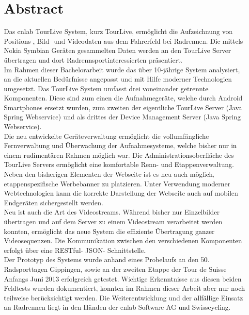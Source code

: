 \chapter*{Abstract}
Das cnlab TourLive System, kurz TourLive, ermöglicht die Aufzeichnung von Positions-, Bild- und Videodaten aus dem Fahrerfeld bei Radrennen. Die mittels Nokia Symbian Geräten gesammelten Daten werden an den TourLive Server übertragen und dort Radrennsportinteressierten präsentiert.
\\

Im Rahmen dieser Bachelorarbeit wurde das über 10-jährige System analysiert, an die aktuellen Bedürfnisse angepasst und mit Hilfe moderner Technologien umgesetzt. Das TourLive System umfasst drei voneinander getrennte Komponenten. Diese sind zum einen die Aufnahmegeräte, welche durch Android Smartphones ersetzt wurden, zum zweiten der eigentliche TourLive Server (Java Spring Webservice) und als drittes der Device Management Server (Java Spring Webservice). 
\\ 

Die neu entwickelte Geräteverwaltung ermöglicht die vollumfängliche Fernverwaltung und Überwachung der Aufnahmesysteme, welche bisher nur in einem rudimentären Rahmen möglich war. Die Administrationsoberfläche des TourLive Servers ermöglicht eine komfortable Renn- und Etappenverwaltung. Neben den bisherigen Elementen der Webseite ist es neu auch möglich, etappenspezifische Werbebanner zu platzieren. Unter Verwendung moderner Webtechnologien kann die korrekte  Darstellung der Webseite auch auf mobilen Endgeräten sichergestellt werden.
\\

Neu ist auch die Art des Videostreams. Während bisher nur Einzelbilder übertragen und auf dem Server zu einem Videostream verarbeitet werden konnten, ermöglicht das neue System die effiziente Übertragung ganzer Videosequenzen. Die Kommunikation zwischen den verschiedenen Komponenten erfolgt über eine RESTful- JSON- Schnittstelle. 
\\

Der Prototyp des Systems wurde anhand eines Probelaufs an den 50. Radsporttagen Gippingen, sowie an der zweiten Etappe der Tour de Suisse Anfangs Juni 2013 erfolgreich getestet. Wichtige Erkenntnisse aus diesen beiden Feldtests wurden dokumentiert, konnten im Rahmen dieser Arbeit aber nur noch teilweise berücksichtigt werden. Die Weiterentwicklung und der allfällige Einsatz an Radrennen liegt in den Händen der cnlab Software AG und Swisscycling.
